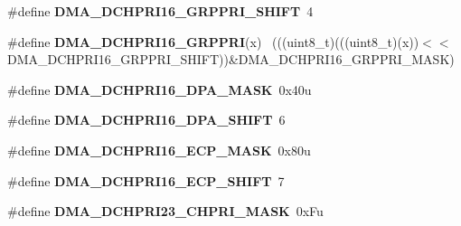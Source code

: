 \begin{DoxyCompactItemize}
\item 
\hypertarget{group___d_m_a___register___masks_ga7848f680f49ac10462978f4b6a20ce66}{}\#define {\bfseries D\+M\+A\+\_\+\+D\+C\+H\+P\+R\+I16\+\_\+\+G\+R\+P\+P\+R\+I\+\_\+\+S\+H\+I\+F\+T}~4\label{group___d_m_a___register___masks_ga7848f680f49ac10462978f4b6a20ce66}

\item 
\hypertarget{group___d_m_a___register___masks_ga1087194f976d68a1898bee35cfdc235b}{}\#define {\bfseries D\+M\+A\+\_\+\+D\+C\+H\+P\+R\+I16\+\_\+\+G\+R\+P\+P\+R\+I}(x)                                  ~(((uint8\+\_\+t)(((uint8\+\_\+t)(x))$<$$<$D\+M\+A\+\_\+\+D\+C\+H\+P\+R\+I16\+\_\+\+G\+R\+P\+P\+R\+I\+\_\+\+S\+H\+I\+F\+T))\&D\+M\+A\+\_\+\+D\+C\+H\+P\+R\+I16\+\_\+\+G\+R\+P\+P\+R\+I\+\_\+\+M\+A\+S\+K)\label{group___d_m_a___register___masks_ga1087194f976d68a1898bee35cfdc235b}

\item 
\hypertarget{group___d_m_a___register___masks_ga302407a0494b3ef4be9c27bc90f02b7c}{}\#define {\bfseries D\+M\+A\+\_\+\+D\+C\+H\+P\+R\+I16\+\_\+\+D\+P\+A\+\_\+\+M\+A\+S\+K}~0x40u\label{group___d_m_a___register___masks_ga302407a0494b3ef4be9c27bc90f02b7c}

\item 
\hypertarget{group___d_m_a___register___masks_ga50bb33b8ac84912ea34ad6b60417f85a}{}\#define {\bfseries D\+M\+A\+\_\+\+D\+C\+H\+P\+R\+I16\+\_\+\+D\+P\+A\+\_\+\+S\+H\+I\+F\+T}~6\label{group___d_m_a___register___masks_ga50bb33b8ac84912ea34ad6b60417f85a}

\item 
\hypertarget{group___d_m_a___register___masks_ga16543c0bd33d84e083d5c2f6bdc07971}{}\#define {\bfseries D\+M\+A\+\_\+\+D\+C\+H\+P\+R\+I16\+\_\+\+E\+C\+P\+\_\+\+M\+A\+S\+K}~0x80u\label{group___d_m_a___register___masks_ga16543c0bd33d84e083d5c2f6bdc07971}

\item 
\hypertarget{group___d_m_a___register___masks_ga6b5fe8a251ff0c45004ce5ad14fdfc34}{}\#define {\bfseries D\+M\+A\+\_\+\+D\+C\+H\+P\+R\+I16\+\_\+\+E\+C\+P\+\_\+\+S\+H\+I\+F\+T}~7\label{group___d_m_a___register___masks_ga6b5fe8a251ff0c45004ce5ad14fdfc34}

\item 
\hypertarget{group___d_m_a___register___masks_ga41d74ad4669aa5953e2df3a7cc37f41d}{}\#define {\bfseries D\+M\+A\+\_\+\+D\+C\+H\+P\+R\+I23\+\_\+\+C\+H\+P\+R\+I\+\_\+\+M\+A\+S\+K}~0x\+Fu\label{group___d_m_a___register___masks_ga41d74ad4669aa5953e2df3a7cc37f41d}


\end{DoxyCompactItemize}
